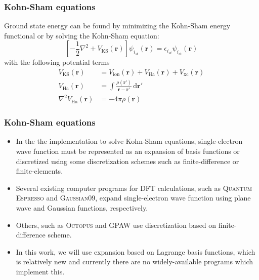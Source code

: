 \documentclass[10pt,t]{beamer}
\begin{document}
\begin{frame}[c]
\frametitle{Kohn-Sham equations}

Ground state energy can be found by minimizing the Kohn-Sham energy functional or
by solving the Kohn-Sham equation:
\begin{equation}
\left[
-\frac{1}{2}\nabla^2  + V_{\mathrm{KS}}(\mathbf{r})
\right] \psi_{i_{st}}(\mathbf{r}) =
\epsilon_{i_{st}}\psi_{i_{st}}(\mathbf{r})
\end{equation}
with the following potential terms
\begin{align*}
V_{\mathrm{KS}}(\mathbf{r}) & = V_{\mathrm{ion}}(\mathbf{r}) + V_{\mathrm{Ha}}(\mathbf{r})
+ V_{\mathrm{xc}}(\mathbf{r}) \\
%
V_{\mathrm{Ha}}(\mathbf{r}) & = \int
\frac{\rho(\mathbf{r}')}
{\mathbf{r} - \mathbf{r}'}\,\mathrm{d}\mathbf{r}' \\
%
\nabla^{2} V_{\mathrm{Ha}}(\mathbf{r}) & = -4\pi \rho(\mathbf{r})
\end{align*}


\end{frame}


\begin{frame}[c]
\frametitle{Kohn-Sham equations}

\begin{itemize}
\item In the the implementation to solve Kohn-Sham equations, single-electron wave function must be
  represented as an expansion of basis functions or discretized using
  some discretization schemes such as finite-difference or finite-elements.
\item Several
  existing computer programs for DFT calculations, such as
  \textsc{Quantum Espresso} and \textsc{Gaussian09},
  expand single-electron wave function using plane wave and Gaussian functions, respectively.
\item Others, such as \textsc{Octopus} and \textsc{GPAW} use discretization based on finite-difference scheme.
\item In this work, we will use expansion based on Lagrange basis functions, which is relatively new
and currently there are no widely-available programs which implement this.
\end{itemize}

\end{frame}
\end{document}
